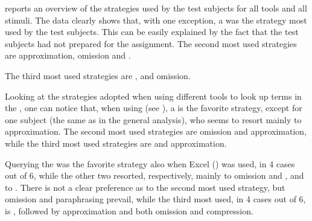 \documentclass[output=paper]{langsci/langscibook}
\begin{document}
 reports an overview of the strategies used by the test subjects for all tools and all stimuli. The data clearly shows that, with one exception, a  was the strategy most used by the test subjects. This can be easily explained by the fact that the test subjects had not prepared for the assignment. The second most used strategies are approximation, omission and .

The third most used strategies are ,  and omission.

Looking at the strategies adopted when using different tools to look up terms in the , one can notice that, when using  (see ), a  is the favorite strategy, except for one subject (the same as in the general analysis), who seems to resort mainly to approximation. The second most used strategies are omission and approximation, while the third most used strategies are  and approximation.

Querying the  was the favorite strategy also when Excel () was used, in 4 cases out of 6, while the other two resorted, respectively, mainly to omission and , and to . There is not a clear preference as to the second most used strategy, but omission and paraphrasing prevail, while the third most used, in 4 cases out of 6, is , followed by approximation and both omission and compression.
\end{document}
